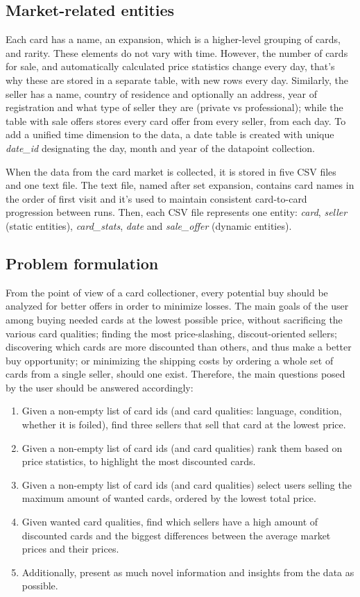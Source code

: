 \subsection{Market-related entities}
\label{entities}
Each card has a name, an expansion, which is a higher-level grouping of cards, and rarity. These elements do not vary with time. However, the number of cards for sale, and automatically calculated price statistics change every day, that's why these are stored in a separate table, with new rows every day. Similarly, the seller has a name, country of residence and optionally an address, year of registration and what type of seller they are (private vs professional); while the table with sale offers stores every card offer from every seller, from each day. To add a unified time dimension to the data, a date table is created with unique \textit{date\_id} designating the day, month and year of the datapoint collection.

When the data from the card market is collected, it is stored in five CSV files and one text file. The text file, named after set expansion, contains card names in the order of first visit and it's used to maintain consistent card-to-card progression between runs. Then, each CSV file represents one entity: \textit{card}, \textit{seller} (static entities), \textit{card\_stats}, \textit{date} and \textit{sale\_offer} (dynamic entities).

\subsection{Problem formulation}
From the point of view of a card collectioner, every potential buy should be analyzed for better offers in order to minimize losses. The main goals of the user among buying needed cards at the lowest possible price, without sacrificing the various card qualities; finding the most price-slashing, discout-oriented sellers; discovering which cards are more discounted than others, and thus make a better buy opportunity; or minimizing the shipping costs by ordering a whole set of cards from a single seller, should one exist. Therefore, the main questions posed by the user should be answered accordingly:
\begin{enumerate}
    \item Given a non-empty list of card ids (and card qualities: language, condition, whether it is foiled), find three sellers that sell that card at the lowest price.
    \item Given a non-empty list of card ids (and card qualities) rank them based on price statistics, to highlight the most discounted cards.
    \item Given a non-empty list of card ids (and card qualities) select users selling the maximum amount of wanted cards, ordered by the lowest total price.
    \item Given wanted card qualities, find which sellers have a high amount of discounted cards and the biggest differences between the average market prices and their prices.
    \item Additionally, present as much novel information and insights from the data as possible.
\end{enumerate}

